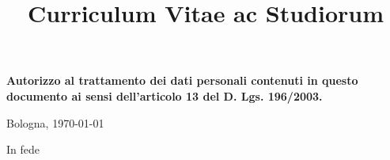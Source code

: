 \documentclass[11pt,a4paper,sans]{moderncv} %
\title{Curriculum Vitae ac Studiorum}
\begin{document}
  \ifdefined\eng
  \else
  \fi
  
  \makecvtitle %

  
  
  
  
  
  
  

  

  
  

  

  

  
  





  


  \vspace*{\fill}
  \textbf{Autorizzo al trattamento dei dati personali contenuti in questo documento ai sensi dell'articolo 13 del D. Lgs. 196/2003.}

  \begin{flushright}
    Bologna, \today

   {
    In fede
  }{}

  \vspace*{0.5cm}


  \end{flushright}
\end{document}
